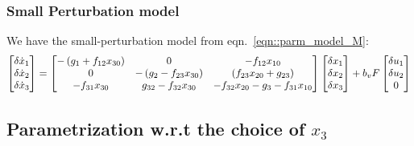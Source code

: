 \subsubsection{Small Perturbation model}
We have the small-perturbation model from eqn.~\ref{eqn::parm_model_M}:
\begin{equation}\label{eqn::sml_ptrb_M}
     \begin{bmatrix} \delta \dot x_1 \\
        \delta \dot x_2\\
        \delta \dot x_3\\
         \end{bmatrix} =
    \begin{bmatrix} 
        -\left( g_1 + f_{12} x_{30} \right) &
        0                                  &
        -f_{12} x_{10}
        \\
        0 &
        -\left( g_2 - f_{23} x_{30} \right) &
        \left( f_{23} x_{20}+ g_{23} \right)
        \\
        -f_{31} x_{30}  &
        g_{32} - f_{32} x_{30}&
        -f_{32} x_{20} - g_3 - f_{31} x_{10}
     \end{bmatrix}
    \begin{bmatrix} \delta x_1\\
        \delta x_2\\
        \delta x_3\\
         \end{bmatrix}
    + b_v F \begin{bmatrix} \delta u_1 \\ \delta u_2 \\ 0 \end{bmatrix}
\end{equation}


\subsection{Parametrization w.r.t the choice of $x_3$}

